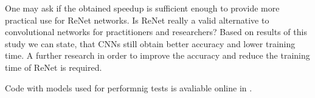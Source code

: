 \documentclass[a4paper, 10 pt, journal]{ieeeconf}
\begin{document}
One may ask if the obtained speedup is sufficient enough to provide more practical use for ReNet networks. Is ReNet really a valid alternative to convolutional networks for practitioners and researchers? Based on results of this study we can state, that CNNs still obtain better accuracy and lower training time. A further research in order to improve the accuracy and reduce the training time of ReNet is required.

Code with models used for performnig tests is avaliable online in \cite{repo}.




\end{document}
